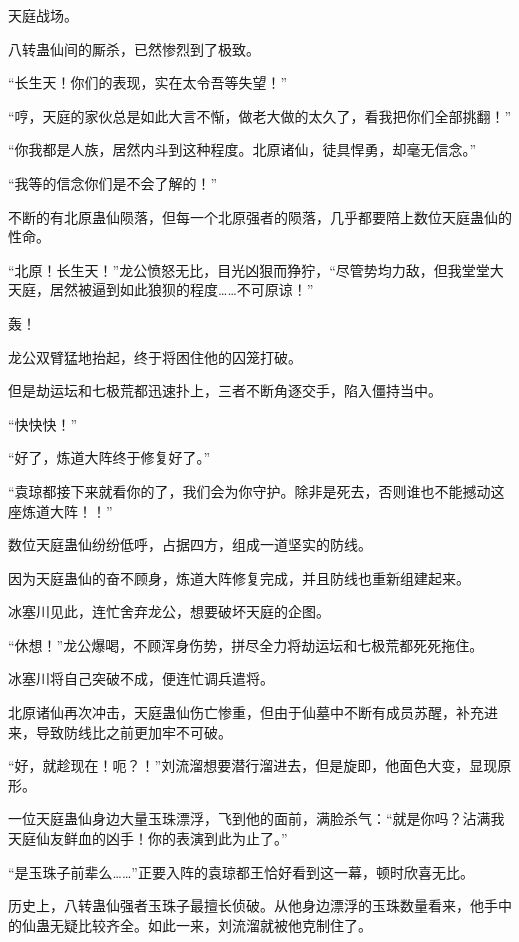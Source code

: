 
\begin{this_body}



天庭战场。

八转蛊仙间的厮杀，已然惨烈到了极致。

“长生天！你们的表现，实在太令吾等失望！”

“哼，天庭的家伙总是如此大言不惭，做老大做的太久了，看我把你们全部挑翻！”

“你我都是人族，居然内斗到这种程度。北原诸仙，徒具悍勇，却毫无信念。”

“我等的信念你们是不会了解的！”

不断的有北原蛊仙陨落，但每一个北原强者的陨落，几乎都要陪上数位天庭蛊仙的性命。

“北原！长生天！”龙公愤怒无比，目光凶狠而狰狞，“尽管势均力敌，但我堂堂大天庭，居然被逼到如此狼狈的程度……不可原谅！”

轰！

龙公双臂猛地抬起，终于将困住他的囚笼打破。

但是劫运坛和七极荒都迅速扑上，三者不断角逐交手，陷入僵持当中。

“快快快！”

“好了，炼道大阵终于修复好了。”

“袁琼都接下来就看你的了，我们会为你守护。除非是死去，否则谁也不能撼动这座炼道大阵！！”

数位天庭蛊仙纷纷低呼，占据四方，组成一道坚实的防线。

因为天庭蛊仙的奋不顾身，炼道大阵修复完成，并且防线也重新组建起来。

冰塞川见此，连忙舍弃龙公，想要破坏天庭的企图。

“休想！”龙公爆喝，不顾浑身伤势，拼尽全力将劫运坛和七极荒都死死拖住。

冰塞川将自己突破不成，便连忙调兵遣将。

北原诸仙再次冲击，天庭蛊仙伤亡惨重，但由于仙墓中不断有成员苏醒，补充进来，导致防线比之前更加牢不可破。

“好，就趁现在！呃？！”刘流溜想要潜行溜进去，但是旋即，他面色大变，显现原形。

一位天庭蛊仙身边大量玉珠漂浮，飞到他的面前，满脸杀气：“就是你吗？沾满我天庭仙友鲜血的凶手！你的表演到此为止了。”

“是玉珠子前辈么……”正要入阵的袁琼都王恰好看到这一幕，顿时欣喜无比。

历史上，八转蛊仙强者玉珠子最擅长侦破。从他身边漂浮的玉珠数量看来，他手中的仙蛊无疑比较齐全。如此一来，刘流溜就被他克制住了。


\end{this_body}
